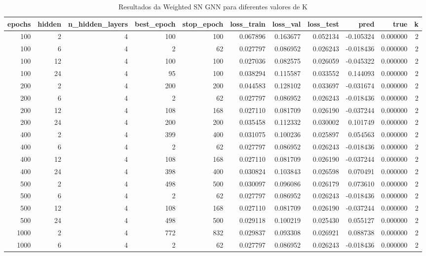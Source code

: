 \begin{table}
\caption{Resultados da Weighted SN GNN para diferentes valores de K}
\label{tab:weighted_gnn_results_all_k}
\begin{tabular}{rrrrrrrrrrr}
\toprule
epochs & hidden & n\_hidden\_layers & best\_epoch & stop\_epoch & loss\_train & loss\_val & loss\_test & pred & true & k \\
\midrule
100 & 2 & 4 & 100 & 100 & 0.067896 & 0.163677 & 0.052134 & -0.105324 & 0.000000 & 2 \\
100 & 6 & 4 & 2 & 62 & 0.027797 & 0.086952 & 0.026243 & -0.018436 & 0.000000 & 2 \\
100 & 12 & 4 & 100 & 100 & 0.027036 & 0.082575 & 0.026059 & -0.045322 & 0.000000 & 2 \\
100 & 24 & 4 & 95 & 100 & 0.038294 & 0.115587 & 0.033552 & 0.144093 & 0.000000 & 2 \\
200 & 2 & 4 & 200 & 200 & 0.044583 & 0.128102 & 0.033697 & -0.031674 & 0.000000 & 2 \\
200 & 6 & 4 & 2 & 62 & 0.027797 & 0.086952 & 0.026243 & -0.018436 & 0.000000 & 2 \\
200 & 12 & 4 & 108 & 168 & 0.027110 & 0.081709 & 0.026190 & -0.037244 & 0.000000 & 2 \\
200 & 24 & 4 & 200 & 200 & 0.035458 & 0.112332 & 0.030002 & 0.101749 & 0.000000 & 2 \\
400 & 2 & 4 & 399 & 400 & 0.031075 & 0.100236 & 0.025897 & 0.054563 & 0.000000 & 2 \\
400 & 6 & 4 & 2 & 62 & 0.027797 & 0.086952 & 0.026243 & -0.018436 & 0.000000 & 2 \\
400 & 12 & 4 & 108 & 168 & 0.027110 & 0.081709 & 0.026190 & -0.037244 & 0.000000 & 2 \\
400 & 24 & 4 & 398 & 400 & 0.030824 & 0.103843 & 0.026598 & 0.070491 & 0.000000 & 2 \\
500 & 2 & 4 & 498 & 500 & 0.030097 & 0.096086 & 0.026179 & 0.073610 & 0.000000 & 2 \\
500 & 6 & 4 & 2 & 62 & 0.027797 & 0.086952 & 0.026243 & -0.018436 & 0.000000 & 2 \\
500 & 12 & 4 & 108 & 168 & 0.027110 & 0.081709 & 0.026190 & -0.037244 & 0.000000 & 2 \\
500 & 24 & 4 & 498 & 500 & 0.029118 & 0.100219 & 0.025430 & 0.055127 & 0.000000 & 2 \\
1000 & 2 & 4 & 772 & 832 & 0.029837 & 0.093308 & 0.026921 & 0.088738 & 0.000000 & 2 \\
1000 & 6 & 4 & 2 & 62 & 0.027797 & 0.086952 & 0.026243 & -0.018436 & 0.000000 & 2 \\

\end{tabular}
\end{table}
